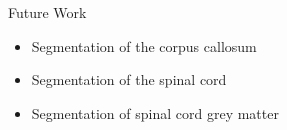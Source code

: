 \documentclass{beamer}
\begin{document}
\begin{frame}{Future Work}
\begin{itemize}
\item Segmentation of the corpus callosum
\item<3-> Segmentation of the spinal cord
\item<5-> Segmentation of spinal cord grey matter
\end{itemize}
\begin{center}
%
%
%
%

\end{center}
\end{frame}
\end{document}
